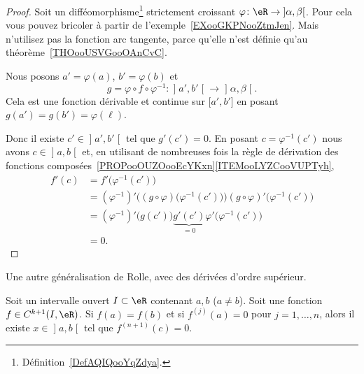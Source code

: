 \begin{proof}
	Soit un difféomorphisme\footnote{Définition~\ref{DefAQIQooYqZdya}.} strictement croissant \( \varphi\colon \eR\to \mathopen] \alpha , \beta \mathclose[\). Pour cela vous pouvez bricoler à partir de l'exemple~\ref{EXooGKPNooZtmJen}.
		Mais n'utilisez pas la fonction arc tangente, parce qu'elle n'est définie qu'au théorème~\ref{THOooUSVGooOAnCvC}.

		Nous posons \( a'=\varphi(a)\), \( b'=\varphi(b)\) et
		\begin{equation}
			g= \varphi\circ f\circ \varphi^{-1}\colon \mathopen] a' , b' \mathclose[\to \mathopen] \alpha , \beta \mathclose[.
		\end{equation}
		Cela est une fonction dérivable et continue sur \( \mathopen[ a' , b' \mathclose]\) en posant \( g(a')=g(b')=\varphi(\ell)\).

		Donc il existe \( c'\in\mathopen] a' , b' \mathclose[\) tel que \( g'(c')=0\). En posant \( c=\varphi^{-1}(c')\) nous avons \( c\in \mathopen] a , b \mathclose[\) et, en utilisant de nombreuses fois la règle de dérivation des fonctions composées~\ref{PROPooOUZOooEcYKxn}\ref{ITEMooLYZCooVUPTyh},
	\begin{subequations}
		\begin{align}
			f'(c) & =f'\big( \varphi^{-1}(c') \big)                                                                                      \\
			      & =(\varphi^{-1})'\Big( (g\circ \varphi)\big( \varphi^{-1}(c') \big) \Big)(g\circ\varphi)'\big( \varphi^{-1}(c') \big) \\
			      & =(\varphi^{-1})'\big( g(c') \big)\underbrace{g'(c')}_{=0}\varphi'\big( \varphi^{-1}(c') \big)                        \\
			      & =0.
		\end{align}
	\end{subequations}
\end{proof}

Une autre généralisation de Rolle, avec des dérivées d'ordre supérieur.
\begin{proposition}      \label{PROPooCPCAooJjOZNy}
	Soit un intervalle ouvert \( I\subset \eR\) contenant \( a,b\) (\( a\neq b\)). Soit une fonction \( f\in C^{k+1}(I,\eR)\). Si \( f(a)=f(b)\) et si \( f^{(j)}(a)=0\) pour \( j=1,\ldots, n\), alors il existe \( x\in \mathopen] a , b \mathclose[\) tel que \( f^{(n+1)}(c)=0\).
\end{proposition}

